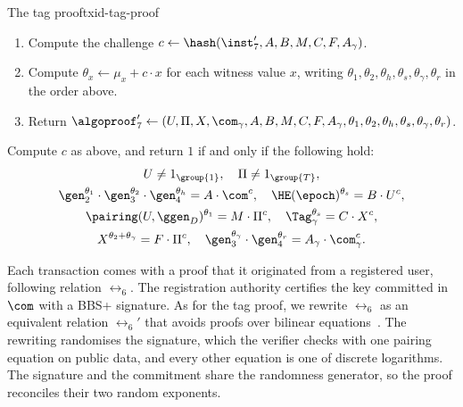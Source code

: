\begin{protocolbox}{The tag proof}{txid-tag-proof}
\begin{description}
\begin{enumerate}
	\item Compute the challenge $c \leftarrow \hash(\inst_7', A, B, M, C, F,
A_\gamma)$.

	\item Compute $\theta_x \leftarrow \mu_x + c\cdot x$ for each witness
value $x$, writing $\theta_1, \theta_2, \theta_h, \theta_s, \theta_\gamma,
\theta_r$ in the order above.

	\item Return $\algoproof_7' \leftarrow (U, \Pi, X, \com_\gamma, \allowbreak
A, \allowbreak B, \allowbreak M, \allowbreak C, \allowbreak F, \allowbreak
A_\gamma, \allowbreak \theta_1, \theta_2, \theta_h, \theta_s, \theta_\gamma,
\theta_r)$.

      \end{enumerate}

    \item[$\{0,1\} \leftarrow \NIZKverify(\crs_7, \inst_7, \algoproof_7')$ :]
Compute $c$ as above, and return $1$ if and only if the following hold:
      \begin{gather*} U \neq 1_{\group{1}}, \quad \Pi \neq 1_{\group{T}}, \\
\gen_2^{\theta_1}\cdot\gen_3^{\theta_2}\cdot
\gen_4^{\theta_h} = A \cdot \com^c, \quad \HE(\epoch)^{\theta_s}
= B \cdot U^c, \\ \pairing(U,\ggen_D)^{\theta_1} = M
\cdot \Pi^c, \quad \Tag_\gamma^{\theta_s} = C \cdot X^c, \\
X^{\theta_2 + \theta_\gamma} = F \cdot \Pi^c, \quad
\gen_3^{\theta_\gamma}\cdot\gen_4^{\theta_r} = A_\gamma \cdot
\com_\gamma^{c}.  \end{gather*}

  \end{description}

\end{protocolbox}

Each transaction comes with a
proof that it originated from a registered user, following relation $\rel_6$.
The registration authority certifies the key committed in $\com$ with a BBS+
signature. As for the tag proof, we rewrite $\rel_6$ as an equivalent relation
$\rel_6'$ that avoids proofs over bilinear
equations~\cite{CDL16,USENIX:HesSinSor23}. The rewriting
randomises the signature, which the verifier checks with one pairing equation on
public data, and every other equation is one of discrete logarithms. The
signature and the commitment share the randomness generator, so the proof
reconciles their two random exponents.

